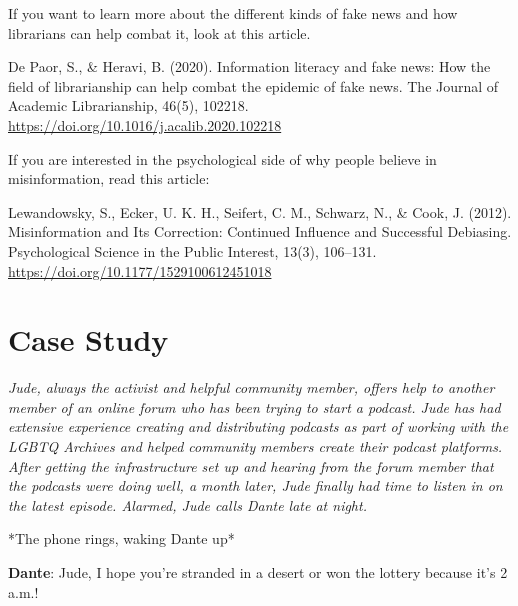 \documentclass[
  letterpaper,
  DIV=11,
  numbers=noendperiod]{scrreprt}
\begin{document}
\begin{tcolorbox}[enhanced jigsaw, arc=.35mm, bottomrule=.15mm, bottomtitle=1mm, breakable, colback=white, colbacktitle=quarto-callout-note-color!10!white, colframe=quarto-callout-note-color-frame, coltitle=black, left=2mm, leftrule=.75mm, opacityback=0, opacitybacktitle=0.6, rightrule=.15mm, title=\textcolor{quarto-callout-note-color}{\faInfo}\hspace{0.5em}{Suggested Reading}, titlerule=0mm, toprule=.15mm, toptitle=1mm]

If you want to learn more about the different kinds of fake news and how
librarians can help combat it, look at this article.

De Paor, S., \& Heravi, B. (2020). Information literacy and fake news:
How the field of librarianship can help combat the epidemic of fake
news. The Journal of Academic Librarianship, 46(5), 102218.
\url{https://doi.org/10.1016/j.acalib.2020.102218}

If you are interested in the psychological side of why people believe in
misinformation, read this article:

Lewandowsky, S., Ecker, U. K. H., Seifert, C. M., Schwarz, N., \& Cook,
J. (2012). Misinformation and Its Correction: Continued Influence and
Successful Debiasing. Psychological Science in the Public Interest,
13(3), 106--131. \url{https://doi.org/10.1177/1529100612451018}

\end{tcolorbox}

\section{Case Study}\label{case-study-6}

\emph{Jude, always the activist and helpful community member, offers
help to another member of an online forum who has been trying to start a
podcast. Jude has had extensive experience creating and distributing
podcasts as part of working with the LGBTQ Archives and helped community
members create their podcast platforms. After getting the infrastructure
set up and hearing from the forum member that the podcasts were doing
well, a month later, Jude finally had time to listen in on the latest
episode. Alarmed, Jude calls Dante late at night.}

*The phone rings, waking Dante up*

\textbf{Dante}: Jude, I hope you're stranded in a desert or won the
lottery because it's 2 a.m.!
\end{document}

